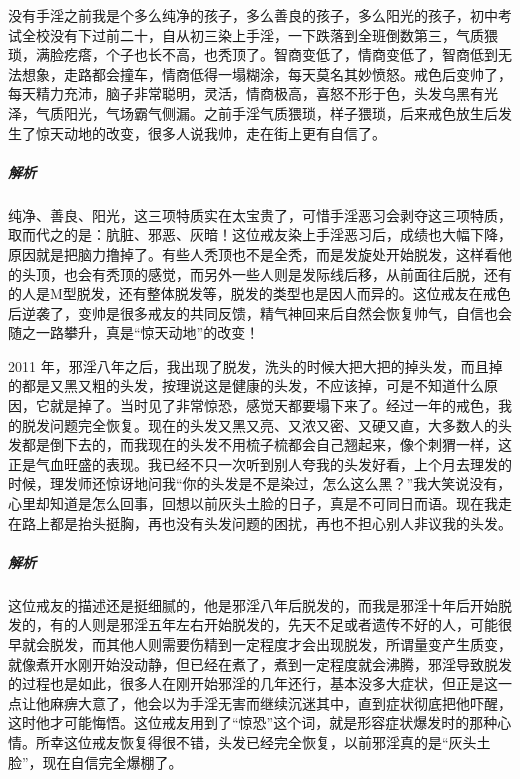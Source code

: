 \begin{case}\label{JiezheDianfengTiyan-ZixindeDafuTisheng1}
    没有手淫之前我是个多么纯净的孩子，多么善良的孩子，多么阳光的孩子，初中考试全校没有下过前二十，自从初三染上手淫，一下跌落到全班倒数第三，气质猥琐，满脸疙瘩，个子也长不高，也秃顶了。智商变低了，情商变低了，智商低到无法想象，走路都会撞车，情商低得一塌糊涂，每天莫名其妙愤怒。戒色后变帅了，每天精力充沛，脑子非常聪明，灵活，情商极高，喜怒不形于色，头发乌黑有光泽，气质阳光，气场霸气侧漏。之前手淫气质猥琐，样子猥琐，后来戒色放生后发生了惊天动地的改变，很多人说我帅，走在街上更有自信了。
    \subparagraph{解析} 纯净、善良、阳光，这三项特质实在太宝贵了，可惜手淫恶习会剥夺这三项特质，取而代之的是：肮脏、邪恶、灰暗！这位戒友染上手淫恶习后，成绩也大幅下降，原因就是把脑力撸掉了。有些人秃顶也不是全秃，而是发旋处开始脱发，这样看他的头顶，也会有秃顶的感觉，而另外一些人则是发际线后移，从前面往后脱，还有的人是M型脱发，还有整体脱发等，脱发的类型也是因人而异的。这位戒友在戒色后逆袭了，变帅是很多戒友的共同反馈，精气神回来后自然会恢复帅气，自信也会随之一路攀升，真是“惊天动地”的改变！
\end{case}

\begin{case}
    2011 年，邪淫八年之后，我出现了脱发，洗头的时候大把大把的掉头发，而且掉的都是又黑又粗的头发，按理说这是健康的头发，不应该掉，可是不知道什么原因，它就是掉了。当时见了非常惊恐，感觉天都要塌下来了。经过一年的戒色，我的脱发问题完全恢复。现在的头发又黑又亮、又浓又密、又硬又直，大多数人的头发都是倒下去的，而我现在的头发不用梳子梳都会自己翘起来，像个刺猬一样，这正是气血旺盛的表现。我已经不只一次听到别人夸我的头发好看，上个月去理发的时候，理发师还惊讶地问我“你的头发是不是染过，怎么这么黑？”我大笑说没有，心里却知道是怎么回事，回想以前灰头土脸的日子，真是不可同日而语。现在我走在路上都是抬头挺胸，再也没有头发问题的困扰，再也不担心别人非议我的头发。
    \subparagraph{解析} 这位戒友的描述还是挺细腻的，他是邪淫八年后脱发的，而我是邪淫十年后开始脱发的，有的人则是邪淫五年左右开始脱发的，先天不足或者遗传不好的人，可能很早就会脱发，而其他人则需要伤精到一定程度才会出现脱发，所谓量变产生质变，就像煮开水刚开始没动静，但已经在煮了，煮到一定程度就会沸腾，邪淫导致脱发的过程也是如此，很多人在刚开始邪淫的几年还行，基本没多大症状，但正是这一点让他麻痹大意了，他会以为手淫无害而继续沉迷其中，直到症状彻底把他吓醒，这时他才可能悔悟。这位戒友用到了“惊恐”这个词，就是形容症状爆发时的那种心情。所幸这位戒友恢复得很不错，头发已经完全恢复，以前邪淫真的是“灰头土脸”，现在自信完全爆棚了。
\end{case}

